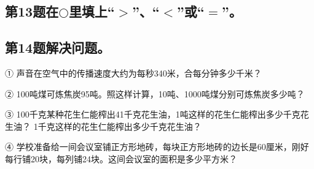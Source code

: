 \subsection*{第13题\quad 在$\bigcirc$里填上“$>$”、“$<$”或“$=$”。}
\subsection*{第14题\quad 解决问题。}
\noindent ① 声音在空气中的传播速度大约为每秒340米，合每分钟多少千米？\par
{}
\noindent ② 100吨煤可炼焦炭95吨。照这样计算，10吨、1000吨煤分别可炼焦炭多少吨？\par
{}
\noindent ③ 100千克某种花生仁能榨出41千克花生油，1吨这样的花生仁能榨出多少千克花生油？ 1千克这样的花生仁能榨出多少千克花生油？\par
{}
\noindent ④ 学校准备给一间会议室铺正方形地砖，每块正方形地砖的边长是60厘米，刚好每行铺20块，每列铺24块。这间会议室的面积是多少平方米？\par
{}

